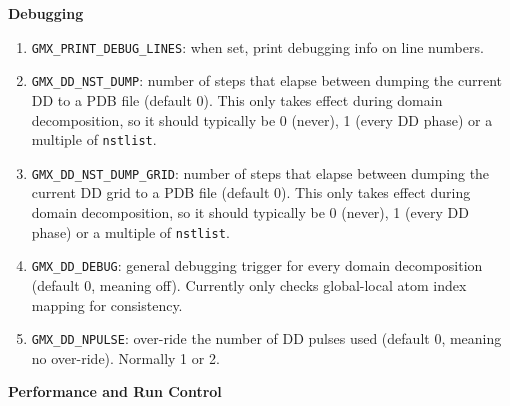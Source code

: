 {\bf Debugging}

\begin{enumerate}

\item   {\tt GMX_PRINT_DEBUG_LINES}: when set, print debugging info on line numbers.
\item   {\tt GMX_DD_NST_DUMP}: number of steps that elapse between dumping
        the current DD to a PDB file (default 0). This only takes effect
        during domain decomposition, so it should typically be
        0 (never), 1 (every DD phase) or a multiple of {\tt nstlist}.
\item   {\tt GMX_DD_NST_DUMP_GRID}: number of steps that elapse between dumping
        the current DD grid to a PDB file (default 0). This only takes effect
        during domain decomposition, so it should typically be
        0 (never), 1 (every DD phase) or a multiple of {\tt nstlist}.
\item   {\tt GMX_DD_DEBUG}: general debugging trigger for every domain
        decomposition (default 0, meaning off). Currently only checks
        global-local atom index mapping for consistency.
\item   {\tt GMX_DD_NPULSE}: over-ride the number of DD pulses used
        (default 0, meaning no over-ride). Normally 1 or 2.


\end{enumerate}

{\bf Performance and Run Control}

